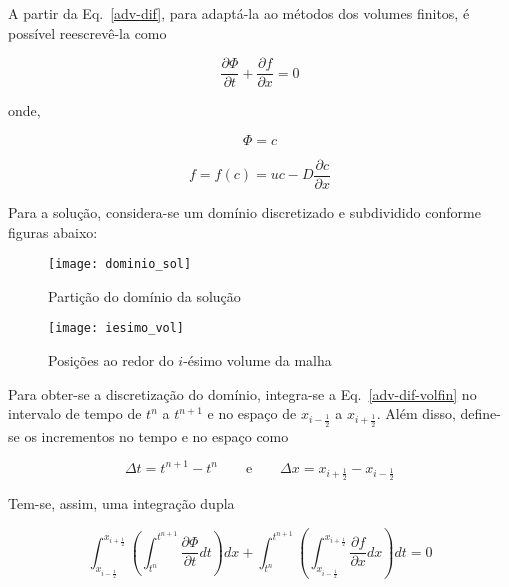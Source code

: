 A partir da Eq.\ \ref{adv-dif}, para adaptá-la ao métodos dos volumes finitos,
é possível reescrevê-la como

\begin{equation}\label{adv-dif-volfin}
    \frac{\partial\Phi}{\partial t} + \frac{\partial f}{\partial x} = 0
\end{equation}

\noindent onde,

\noindent
\begin{minipage}{.4\linewidth}
    \begin{equation}
        \Phi = c
    \end{equation}
\end{minipage}%
\begin{minipage}{.6\linewidth}
    \begin{equation}
        f = f(c) = uc - D\frac{\partial c}{\partial x}
    \end{equation}
\end{minipage}

\bigskip
Para a solução, considera-se um domínio discretizado e subdividido conforme
figuras abaixo:

\begin{figure}[h]
    \centering
    \texttt{[image: dominio\_sol]}
    \caption{Partição do domínio da solução}
\end{figure}

\begin{figure}[h]
    \centering
    \texttt{[image: iesimo\_vol]}
    \caption{Posições ao redor do $i$-ésimo volume da malha}
\end{figure}

\noindent Para obter-se a discretização do domínio, integra-se a Eq.\
\ref{adv-dif-volfin} no intervalo de tempo de $t^n$ a $t^{n+1}$ e no espaço de
$x_{i-\frac{1}{2}}$ a $x_{i+\frac{1}{2}}$. Além disso, define-se os incrementos
no tempo e no espaço como

\begin{equation*}
    \Delta t = t^{n+1} - t^n \qquad\text{e}\qquad \Delta x = x_{i+\frac{1}{2}}
    - x_{i-\frac{1}{2}}
\end{equation*}

\noindent Tem-se, assim, uma integração dupla

\begin{equation*}
    \int_{x_{i-\frac{1}{2}}}^{x_{i+\frac{1}{2}}} \left( \int_{t^n}^{t^{n+1}}
    \frac{\partial \Phi}{\partial t}dt \right)dx
    +
    \int_{t^n}^{t^{n+1}} \left(\int_{x_{i-\frac{1}{2}}}^{x_{i+\frac{1}{2}}}
    \frac{\partial f}{\partial x}dx \right)dt
    = 0
\end{equation*}

